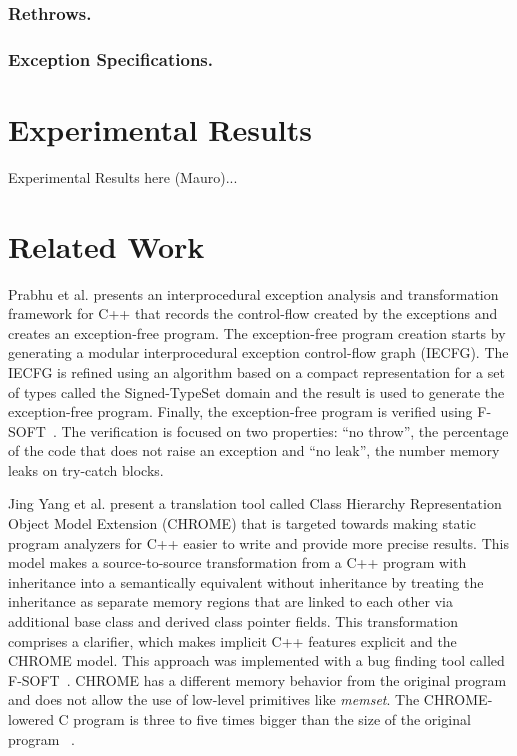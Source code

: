 \documentclass[a4paper]{llncs}
\begin{document}
\subsubsection{Rethrows.}

\subsubsection{Exception Specifications.}

\section{Experimental Results}
%
Experimental Results here (Mauro)...


\section{Related Work}

Prabhu et al. presents an interprocedural exception 
analysis and transformation framework for C++ that 
records the control-flow created by the exceptions 
and creates an exception-free program. The exception-free 
program creation starts by generating a modular interprocedural 
exception control-flow graph (IECFG). The IECFG is refined using 
an algorithm based on a compact representation for a set of types 
called the Signed-TypeSet domain and the result is used 
to generate the exception-free program. Finally, the exception-free 
program is verified using F-SOFT~\cite{Fsoft}. The verification is 
focused on two properties: ``no throw'', the percentage of the code 
that does not raise an exception and ``no leak'', the number memory 
leaks on try-catch blocks.~\cite{PrabhuMBIG11}

Jing Yang et al. present a translation tool called Class Hierarchy 
Representation Object Model Extension (CHROME) that is targeted towards 
making static program analyzers for C++ easier to write and provide 
more precise results. This model makes a source-to-source transformation 
from a C++ program with inheritance into a semantically equivalent without 
inheritance by treating the inheritance as separate memory regions 
that are linked to each other via additional base class and derived class 
pointer fields. This transformation comprises a clarifier, which makes 
implicit C++ features explicit and the CHROME model. This approach was 
implemented with a bug finding tool called F-SOFT~\cite{Fsoft}. CHROME has a 
different memory behavior from the original program and does not allow the use 
of low-level primitives like \textit{memset}. The CHROME-lowered C program is 
three to five times bigger than the size of the original program ~\cite{Yang12}.
\end{document}
